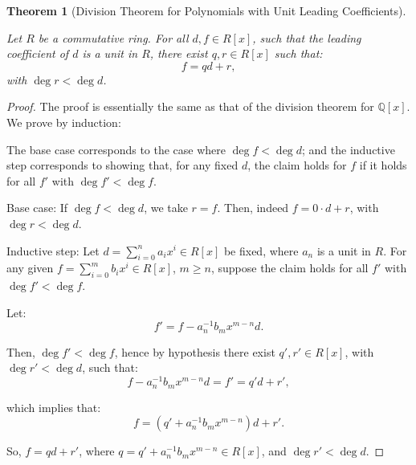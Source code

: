 \documentclass[a4paper,12pt]{report}
\newcounter{statement}
\numberwithin{statement}{chapter}
\newtheorem{thm}[statement]{Theorem}
\numberwithin{equation}{chapter}
\numberwithin{section}{chapter}
\numberwithin{subsection}{section}
\begin{document}
\begin{thm}[Division Theorem for Polynomials with Unit Leading Coefficients]

\label{thm:divalgpoly}



Let $R$ be a commutative ring.  For all $d, f \in R[x]$, such that the leading coefficient of $d$ is a unit in $R$,
there exist $q , r \in R[x]$ such that:
\[
f = qd + r,
\]
with $\deg r < \deg d$.
\end{thm}
\begin{proof}

The proof is essentially the same as that of the division theorem for $\mathbb{Q}[x]$.  We prove by induction:


The base case corresponds to the case where $\deg f < \deg d$; and the inductive step
corresponds to showing that, for any fixed $d$, the claim holds for $f$ if it holds for all
$f'$ with $\deg f' < \deg f$.


Base case: If $\deg f < \deg d$, we take $r = f$.  Then, indeed $f = 0\cdot d + r$, with $\deg r < \deg d$.


Inductive step:
Let $d =\sum_{i = 0}^n a_i x^i\in R[x]$ be fixed, where $a_n$ is a unit in $R$.
For any given $f = \sum_{i = 0}^m b_ix^i \in R[x]$, $m \geq n$,
suppose the claim holds for all $f'$ with $\deg f' < \deg f$.


Let:
\[
f' = f - a_n^{-1}b_m x^{m - n} d.
\]

Then, $\deg f' < \deg f$, hence by hypothesis there exist $q', r' \in R[x]$, with $\deg r' < \deg d$,
such that:
\[
f - a_n^{-1}b_m x^{m - n} d = f' = q' d + r',
\]

which implies that:
\[
f = (q' + a_n^{-1}b_m x^{m - n}) d + r'.
\]

So, $f = qd + r'$, where $q = q' + a_n^{-1}b_m x^{m - n} \in R[x]$, and $\deg r' < \deg d$.


\end{proof}
\end{document}
